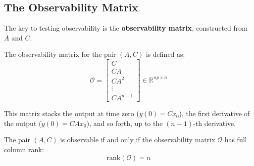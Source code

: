 \subsection{The Observability Matrix}

The key to testing observability is the \textbf{observability matrix}, constructed from $A$ and $C$:

\begin{definition}
The observability matrix for the pair $(A, C)$ is defined as:
\begin{equation}
\mathcal{O} = \begin{bmatrix}
C \\
CA \\
CA^2 \\
\vdots \\
CA^{n-1}
\end{bmatrix} \in \mathbb{R}^{np \times n}
\label{eq:observability_matrix}
\end{equation}
\end{definition}

This matrix stacks the output at time zero ($y(0) = Cx_0$), the first derivative of the output ($\dot{y}(0) = CAx_0$), and so forth, up to the $(n-1)$-th derivative.

\begin{theorem}
The pair $(A, C)$ is observable if and only if the observability matrix $\mathcal{O}$ has full column rank:
\begin{equation}
\text{rank}(\mathcal{O}) = n
\label{eq:observability_rank}
\end{equation}
\end{theorem}

